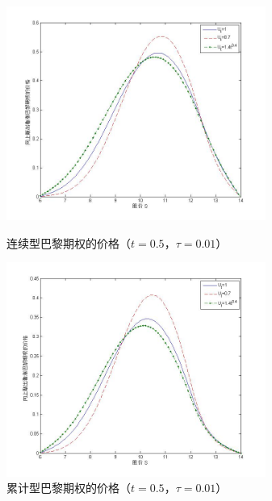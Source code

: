 \documentclass{ctexart} %
\begin{document}
\begin{figure}[H]
\begin{minipage}{0.48\linewidth}
\includegraphics[width=8.5cm]{code/t0.5.jpg}
\caption{连续型巴黎期权的价格（$t=0.5$，$\tau=0.01$）}
\end{minipage}
\begin{minipage}{0.48\linewidth}
\includegraphics[width=8.5cm]{code/tc0.5.jpg}
\caption{累计型巴黎期权的价格（$t=0.5$，$\tau=0.01$）}
\end{minipage}
\end{figure}
\end{document}
